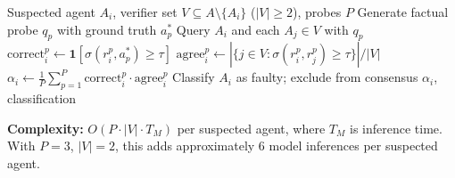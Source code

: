 \documentclass[journal,10pt]{IEEEtran}
\begin{document}
\begin{algorithm}[t]
\caption{Cross-Attestation Probing (CAP)}
\label{alg:cap}
\begin{algorithmic}[1]
\REQUIRE Suspected agent $A_i$, verifier set $V \subseteq A \setminus \{A_i\}$ ($|V| \geq 2$), probes $P$
    \STATE Generate factual probe $q_p$ with ground truth $a_p^*$
    \STATE Query $A_i$ and each $A_j \in V$ with $q_p$
    \STATE $\text{correct}_i^p \gets \mathbf{1}[\sigma(r_i^p, a_p^*) \geq \tau]$
    \STATE $\text{agree}_i^p \gets |\{j \in V : \sigma(r_i^p, r_j^p) \geq \tau\}| / |V|$
\ENDFOR
\STATE $\alpha_i \gets \frac{1}{P}\sum_{p=1}^{P} \text{correct}_i^p \cdot \text{agree}_i^p$
    \STATE Classify $A_i$ as faulty; exclude from consensus
\ENDIF
\RETURN $\alpha_i$, classification
\end{algorithmic}
\end{algorithm}

\textbf{Complexity:} $O(P \cdot |V| \cdot T_M)$ per suspected agent, where $T_M$ is inference time. With $P = 3$, $|V| = 2$, this adds approximately 6 model inferences per suspected agent.

\end{document}
